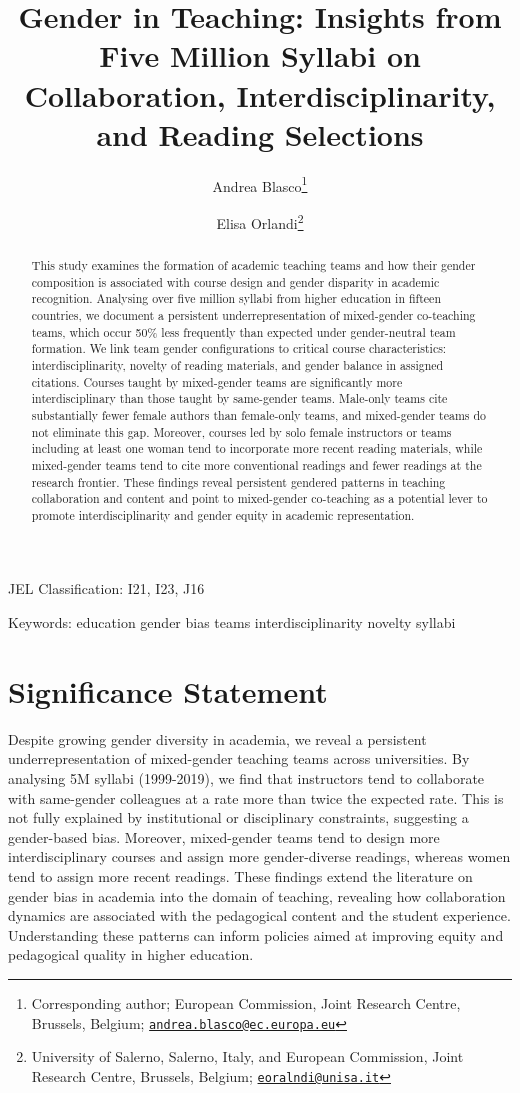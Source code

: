 \documentclass[
  british,
  11pt,
]{article}
\title{Gender in Teaching:
Insights from Five Million Syllabi on Collaboration, Interdisciplinarity, and Reading Selections}
\author{Andrea Blasco\footnote{Corresponding author; European Commission, Joint Research Centre, Brussels, Belgium; \href{mailto:andrea.blasco@ec.europa.eu}{\nolinkurl{andrea.blasco@ec.europa.eu}}} \and Elisa Orlandi\footnote{University of Salerno, Salerno, Italy, and European Commission, Joint Research Centre, Brussels, Belgium; \href{mailto:eoralndi@unisa.it}{\nolinkurl{eoralndi@unisa.it}}}}
\date{}
\begin{document}
\maketitle
\begin{abstract}
This study examines the formation of academic teaching teams and how their gender composition is associated with course design and gender disparity in academic recognition. Analysing over five million syllabi from higher education in fifteen countries, we document a persistent underrepresentation of mixed-gender co-teaching teams, which occur 50\% less frequently than expected under gender-neutral team formation. We link team gender configurations to critical course characteristics: interdisciplinarity, novelty of reading materials, and gender balance in assigned citations. Courses taught by mixed-gender teams are significantly more interdisciplinary than those taught by same-gender teams. Male-only teams cite substantially fewer female authors than female-only teams, and mixed-gender teams do not eliminate this gap. Moreover, courses led by solo female instructors or teams including at least one woman tend to incorporate more recent reading materials, while mixed-gender teams tend to cite more conventional readings and fewer readings at the research frontier. These findings reveal persistent gendered patterns in teaching collaboration and content and point to mixed-gender co-teaching as a potential lever to promote interdisciplinarity and gender equity in academic representation.
\end{abstract}

JEL Classification: I21, I23, J16

Keywords: education \textbar{} gender bias \textbar{} teams \textbar{} interdisciplinarity \textbar{} novelty \textbar{} syllabi

\newpage

\section*{Significance Statement}\label{significance-statement}

Despite growing gender diversity in academia, we reveal a persistent underrepresentation of mixed-gender teaching teams across universities. By analysing 5M syllabi (1999-2019), we find that instructors tend to collaborate with same-gender colleagues at a rate more than twice the expected rate. This is not fully explained by institutional or disciplinary constraints, suggesting a gender-based bias. Moreover, mixed-gender teams tend to design more interdisciplinary courses and assign more gender-diverse readings, whereas women tend to assign more recent readings. These findings extend the literature on gender bias in academia into the domain of teaching, revealing how collaboration dynamics are associated with the pedagogical content and the student experience. Understanding these patterns can inform policies aimed at improving equity and pedagogical quality in higher education.
\end{document}
